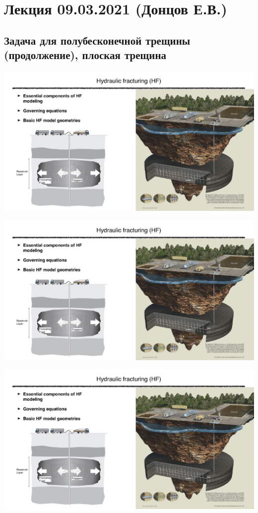 \documentclass[main.tex]{subfiles}
\begin{document}

\section{Лекция 09.03.2021 (Донцов Е.В.)}

\subsection{Задача для полубесконечной трещины (продолжение), плоская трещина}

\includegraphics[width=\textwidth, page=30]{HF_slides.pdf}

\includegraphics[width=\textwidth, page=31]{HF_slides.pdf}

\includegraphics[width=\textwidth, page=32]{HF_slides.pdf}
\end{document}
